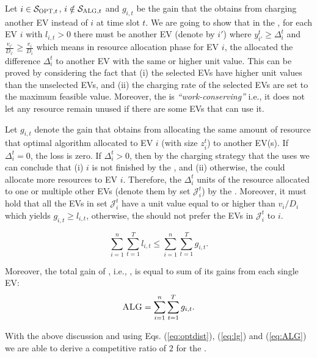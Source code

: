 Let $i\in\mathcal{S}_{\textsc{OPT},t}$, $i\notin\mathcal{S}_{\textsc{ALG},t}$ and $g_{i,t}$ be the gain that the \focs obtains from charging another EV instead of $i$ at time slot $t$. We are going to show that in the \focs, for each EV $i$ with $l_{i,t}>0$ there must be another EV (denote by $i'$) where $y_{i'}^t\geq \Delta_i^t$ and $\frac{v_{i'}}{D_{i'}}\geq \frac{v_i}{D_i}$ which means in resource allocation phase for EV $i$, the \focs allocated the difference $\Delta_i^t$ to another EV with the same or higher unit value. This can be proved by considering the fact that (i) the selected EVs have higher unit values than the unselected EVs, and (ii) the charging rate of the selected EVs are set to the maximum feasible value. Moreover, the \focs is \emph{``work-conserving''} i.e., it does not let any resource remain unused if there are some EVs that can use it. 

Let $g_{i,t}$ denote the gain that \focs obtains from allocating the same amount of resource that optimal algorithm allocated to EV $i$ (with size $z_i^t$) to another EV(s).
If $\Delta_{i}^t=0$, the loss is zero. If $\Delta_{i}^t>0$, then by the charging strategy that the \focs uses we can conclude that (i) $i$ is not finished by the \focs, and (ii)
 otherwise, the \focs could allocate more resources to EV $i$. Therefore, the $\Delta_{i}^t$ units of the resource  allocated to one or multiple other EVs (denote them by set $\mathcal{J}_i^t$) by the \focs. Moreover, it must hold that all the EVs in set $\mathcal{J}_i^t$ have a unit value equal to or higher than $v_i/D_i$ which yields $g_{i,t}\geq l_{i,t}$, otherwise, the \focs should not prefer the EVs in $\mathcal{J}_i^t$ to $i$. 

\begin{equation}
\label{eq:lg}
\sum_{i=1}^n\sum_{t=1}^Tl_{i,t}\leq\sum_{i=1}^n\sum_{t=1}^Tg_{i,t}.
\end{equation}

Moreover, the total gain of \focs, i.e., \alg, is equal to sum of its gains from each single EV:
\begin{equation}
\label{eq:ALG}
\textsc{ALG}= \sum_{i=1}^n\sum_{t=1}^Tg_{i,t}.
\end{equation}

With the above discussion and using Eqs. (\ref{eq:optdist}), (\ref{eq:lg}) and (\ref{eq:ALG}) we are able to derive a competitive ratio of $2$ for the \focs. 

